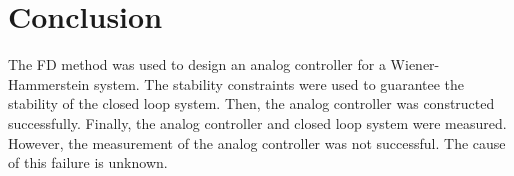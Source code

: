 \section{Conclusion}
The FD method was used to design an analog controller for a Wiener-Hammerstein system. The stability constraints were used to guarantee the stability of the closed loop system. Then, the analog controller was constructed successfully. Finally, the analog controller and closed loop system were measured. However, the measurement of the analog controller was not successful. The cause of this failure is unknown.